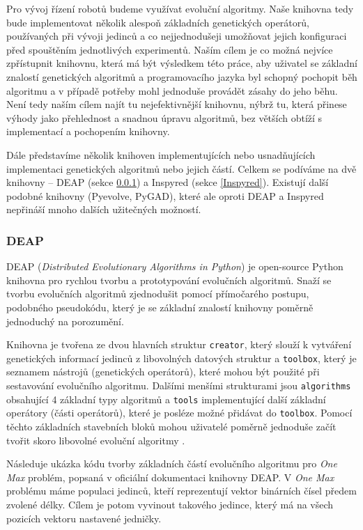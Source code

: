 Pro vývoj řízení robotů budeme využívat evoluční algoritmy. Naše knihovna tedy
bude implementovat několik alespoň základních genetických operátorů,
používaných při vývoji jedinců a co nejjednodušeji umožňovat jejich konfiguraci
před spouštěním jednotlivých experimentů. Naším cílem je co možná nejvíce
zpřístupnit knihovnu, která má být výsledkem této práce, aby uživatel se
základní znalostí genetických algoritmů a programovacího jazyka byl schopný
pochopit běh algoritmu a v případě potřeby mohl jednoduše provádět zásahy do
jeho běhu. Není tedy naším cílem najít tu nejefektivnější knihovnu, nýbrž tu,
která přinese výhody jako přehlednost a snadnou úpravu algoritmů, bez větších
obtíží s implementací a pochopením knihovny.

Dále představíme několik knihoven implementujících nebo usnadňujících
implementaci genetických algoritmů nebo jejich částí. Celkem se podíváme na dvě
knihovny -- DEAP (sekce \ref{DEAP}) a Inspyred (sekce \ref{Inspyred}).
Existují další podobné knihovny (Pyevolve, PyGAD), které ale oproti DEAP a
Inspyred nepřináší mnoho dalších užitečných možností.

\subsubsection{DEAP} \label{DEAP}

DEAP (\emph{Distributed Evolutionary Algorithms in Python}) \citep{deapproject}
je open-source Python knihovna pro rychlou tvorbu a prototypování evolučních
algoritmů. Snaží se tvorbu evolučních algoritmů zjednodušit pomocí přímočarého
postupu, podobného pseudokódu, který je se základní znalostí knihovny poměrně
jednoduchý na porozumění. 

Knihovna je tvořena ze dvou hlavních struktur \texttt{creator}, který slouží k
vytváření genetických informací jedinců z libovolných datových struktur a
\texttt{toolbox}, který je seznamem nástrojů (genetických operátorů), které
mohou být použité při sestavování evolučního algoritmu. Dalšími menšími
strukturami jsou \texttt{algorithms} obsahující 4 základní typy algoritmů a
\texttt{tools} implementující další základní operátory (části operátorů), které
je posléze možné přidávat do \texttt{toolbox}. Pomocí těchto základních
stavebních bloků mohou uživatelé poměrně jednoduše začít tvořit skoro libovolné
evoluční algoritmy \citep{fortin2012deap}. 

Následuje ukázka kódu tvorby základních částí evolučního algoritmu pro
\emph{One Max} problém, popsaná v oficiální dokumentaci knihovny DEAP. V
\emph{One Max} problému máme populaci jedinců, kteří reprezentují vektor
binárních čísel předem zvolené délky. Cílem je potom vyvinout takového jedince,
který má na všech pozicích vektoru nastavené jedničky. 

